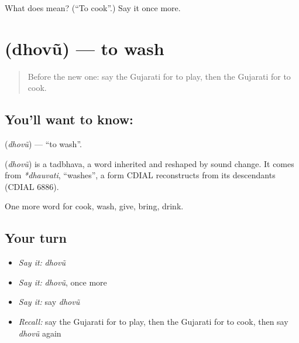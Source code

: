 \begin{tcolorbox}[breakable,colback=teal!4,colframe=teal!35!black,title={Before you move on}]
What does  mean? (\textquotedblleft{}To cook\textquotedblright{}.) Say it once more.
\end{tcolorbox}
\section[\texorpdfstring{\gu{ધોવું} (dhovũ)}{ધોવું (dhovũ)}]{ (dhovũ) — to wash}

\label{lesson:GU-C55-dhovu}



\begin{quote}
Before the new one: say the Gujarati for to play, then the Gujarati for to cook.
\end{quote}

\subsection*{You'll want to know: }
\textbf{} (\emph{dhovũ}) — \textquotedblleft{}to wash\textquotedblright{}.

\begin{cousinweb}
\textbf{} (\emph{dhovũ}) is a tadbhava, a word inherited and reshaped by sound change. It comes from \emph{*dhauvati}, \textquotedblleft{}washes\textquotedblright{}, a form CDIAL reconstructs from its descendants (CDIAL 6886).
\end{cousinweb}

\begin{grammarlens}[title={What you've built}]
One more word for cook, wash, give, bring, drink.
\end{grammarlens}

\subsection*{Your turn}
\begin{itemize}
\raggedright
  \item \emph{Say it:} \emph{dhovũ}
  \item \emph{Say it:} \emph{dhovũ}, once more
  \item \emph{Say it:} say \emph{dhovũ}
  \item \emph{Recall:} say the Gujarati for to play, then the Gujarati for to cook, then say \emph{dhovũ} again
\end{itemize}


